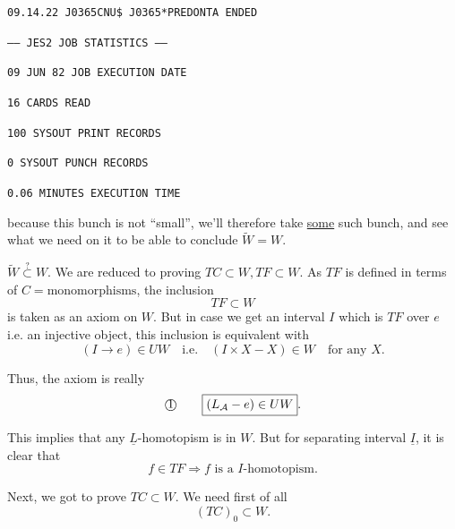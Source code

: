 \texttt{09.14.22 J0365CNU\quad \$ J0365*PREDONTA ENDED}

\texttt{------ JES2 JOB STATISTICS ------}

\texttt{09 JUN 82 JOB EXECUTION DATE}

\texttt{16 CARDS READ}

\texttt{100 SYSOUT PRINT RECORDS}

\texttt{0 SYSOUT PUNCH RECORDS}

\texttt{0.06 MINUTES EXECUTION TIME}



because this bunch is not ``small'', we'll therefore take \uline{some} such bunch, and see what we need on it to be able to conclude $\widetilde W=W$.

$\widetilde W\overset{?}{\subset}W$. We are reduced to proving $TC\subset W,TF\subset W$. As $TF$ is defined in terms of $C=\text{monomorphisms}$, the inclusion
\[
\boxed{TF\subset W}
\]
is taken as an axiom on $W$. But in case we get an  interval $I$ which is $TF$ over $e$ i.e. an injective object,  this inclusion is equivalent with
\[
\boxed{(I\longrightarrow e)\in UW\quad\text{i.e.}\quad(I\times X-X)\in W\quad\text{for any }X}.
\]

Thus, the axiom is really
\[
\text{\textcircled{1}}\qquad\boxed{(L_{\mathcal A}-e)\in UW}.
\]

This implies that any $\underline L$-homotopism is in $W$.
But for  separating interval $\underline I$, it is clear that
\[
f\in TF\Longrightarrow f\text{ is a }I\text{-homotopism}.
\]

Next, we got to prove $TC\subset W$. We need first of all
\[
(TC)_0\subset W.
\]

